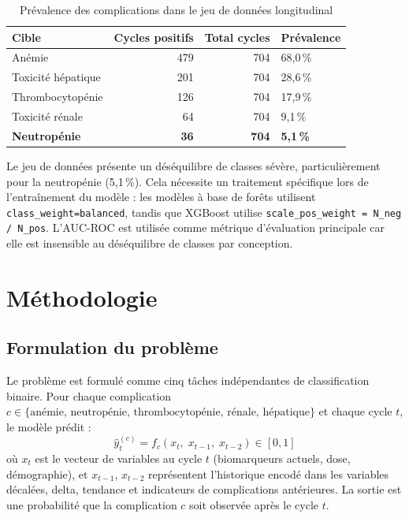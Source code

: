 \documentclass[12pt,a4paper]{report}
\begin{document}
\begin{table}[H]
\centering
\caption{Prévalence des complications dans le jeu de données longitudinal}
\label{tab:imbalance}
\begin{tabular}{lrrl}
\toprule
\textbf{Cible} & \textbf{Cycles positifs} & \textbf{Total cycles} & \textbf{Prévalence} \\
\midrule
Anémie & 479 & 704 & 68,0\,\% \\
Toxicité hépatique & 201 & 704 & 28,6\,\% \\
Thrombocytopénie & 126 & 704 & 17,9\,\% \\
Toxicité rénale & 64 & 704 & 9,1\,\% \\
\textbf{Neutropénie} & \textbf{36} & \textbf{704} & \textbf{5,1\,\%} \\
\bottomrule
\end{tabular}
\end{table}

Le jeu de données présente un déséquilibre de classes sévère, particulièrement pour la neutropénie (5,1\,\%). Cela nécessite un traitement spécifique lors de l'entraînement du modèle : les modèles à base de forêts utilisent \texttt{class\_weight=\textquotesingle{}balanced\textquotesingle{}}, tandis que XGBoost utilise \texttt{scale\_pos\_weight = N\_neg / N\_pos}. L'AUC-ROC est utilisée comme métrique d'évaluation principale car elle est insensible au déséquilibre de classes par conception.

\chapter{Méthodologie}
\label{chap:methodology}

\section{Formulation du problème}

Le problème est formulé comme cinq tâches indépendantes de classification binaire. Pour chaque complication $c \in \{\text{anémie, neutropénie, thrombocytopénie, rénale, hépatique}\}$ et chaque cycle $t$, le modèle prédit :
\[
\hat{y}_t^{(c)} = f_c\!\left(x_t,\; x_{t-1},\; x_{t-2}\right) \in [0, 1]
\]
où $x_t$ est le vecteur de variables au cycle $t$ (biomarqueurs actuels, dose, démographie), et $x_{t-1}$, $x_{t-2}$ représentent l'historique encodé dans les variables décalées, delta, tendance et indicateurs de complications antérieures. La sortie est une probabilité que la complication $c$ soit observée après le cycle $t$.
\end{document}
